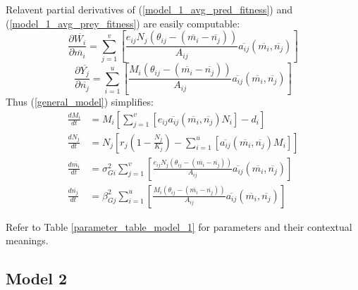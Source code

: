 \documentclass{amsart}
\theoremstyle{definition}
\theoremstyle{remark}
\numberwithin{equation}{section}
\begin{document}
Relavent partial derivatives of (\ref{model_1_avg_pred_fitness}) and (\ref{model_1_avg_prey_fitness}) are easily computable:
\begin{equation}
	\label{model_1_pred_fitness_partial}
	\frac{\partial \overline{W_i}}{\partial \overline{m_i}} = \sum\limits_{j = 1}^{v}\left[\frac{e_{ij}N_j(\theta_{ij} - (\overline{m_i} - \overline{n_j}))}{A_{ij}}\overline{a_{ij}}(\overline{m_i}, \overline{n_j})\right]
\end{equation}
\begin{equation}
	\label{model_1_prey_fitness_partial}
	\frac{\partial \overline{Y_j}}{\partial \overline{n_j}} = \sum\limits_{i = 1}^{u}\left[\frac{M_i(\theta_{ij} - (\overline{m_i} - \overline{n_j}))}{A_{ij}}\overline{a_{ij}}(\overline{m_i}, \overline{n_j})\right]
\end{equation}
Thus (\ref{general_model}) simplifies:
\begin{subequations}
	\label{model1}
	\begin{align}
		\label{eq:model1_a}
		\frac{dM_i}{dt} &= M_i\left[\sum\limits_{j = 1}^{v}\left[e_{ij}\overline{a_{ij}}(\overline{m_i}, \overline{n_j})N_i\right] - d_i\right] \\[5px]
		\label{eq:model1_b}
		\frac{dN_j}{dt} &= N_j\left[r_j\left(1 - \frac{N_j}{K_j}\right) - \sum\limits_{i = 1}^{u}\left[\overline{a_{ij}}(\overline{m_i}, \overline{n_j})M_i\right]\right] \\[5px]
		\label{eq:model1_c}
		\frac{d\overline{m_i}}{dt} &= \sigma_{Gi}^2\sum\limits_{j = 1}^{v}\left[\frac{e_{ij}N_j(\theta_{ij} - (\overline{m_i} - \overline{n_j}))}{A_{ij}}\overline{a_{ij}}(\overline{m_i}, \overline{n_j})\right] \\[5px]
		\label{eq:model1_d}
		\frac{d\overline{n_j}}{dt} &= \beta_{Gj}^2\sum\limits_{i = 1}^{u}\left[\frac{M_i(\theta_{ij} - (\overline{m_i} - \overline{n_j}))}{A_{ij}}\overline{a_{ij}}(\overline{m_i}, \overline{n_j})\right]
	\end{align}
\end{subequations}

Refer to Table \ref{parameter_table_model_1} for parameters and their contextual meanings.















\subsection{Model 2}
\end{document}
